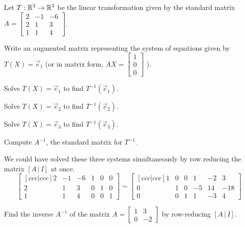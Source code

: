 \begin{applicationActivities}
\begin{activity}{20}
  Let \(T: \mathbb{R}^3 \rightarrow \mathbb{R}^3\) be the linear transformation given by the standard matrix
  \(A=\begin{bmatrix} 2 & -1 & -6 \\ 2 & 1 & 3 \\ 1 & 1 & 4 \end{bmatrix}\).
  \begin{subactivity}
  Write an augmented matrix representing the system of equations given by $T(X)=\vec{e}_1$ (or in matrix form, \(AX=\begin{bmatrix}1 \\ 0 \\ 0 \end{bmatrix}\) ).
  \end{subactivity}
  \begin{subactivity}
  Solve $T(X)=\vec{e}_1$ to find $T^{-1}(\vec{e}_1)$.
  \end{subactivity}
  \begin{subactivity}
   Solve $T(X)=\vec{e}_2$ to find $T^{-1}(\vec{e}_2)$.
  \end{subactivity}
  \begin{subactivity}
   Solve $T(X)=\vec{e}_3$ to find $T^{-1}(\vec{e}_3)$.
  \end{subactivity}
  \begin{subactivity}
  Compute $A^{-1}$, the standard matrix for $T^{-1}$.
  \end{subactivity}
\end{activity}

\begin{observation}
We could have solved these three systems simultaneously
by row reducing the matrix \([A\,|\,I]\) at once.
\[
  \begin{bmatrix}[ccc|ccc]
    2 & -1 & -6 & 1 & 0 & 0 \\
    2 & 1 & 3 & 0 & 1 & 0 \\
    1 & 1 & 4 & 0 & 0 & 1
  \end{bmatrix} \sim
  \begin{bmatrix}[ccc|ccc]
    1 & 0 & 0 & 1 & -2 & 3 \\
    0 & 1 & 0 & -5 & 14 & -18 \\
    0 & 0 & 1 & 1 & -3 & 4
  \end{bmatrix}
\]
\end{observation}


\begin{activity}{5}
  Find the inverse \(A^{-1}\) of the matrix
  \(A=\begin{bmatrix} 1 & 3 \\ 0 & -2 \end{bmatrix}\)
  by row-reducing \([A\,|\,I]\).
\end{activity}


\end{applicationActivities}
